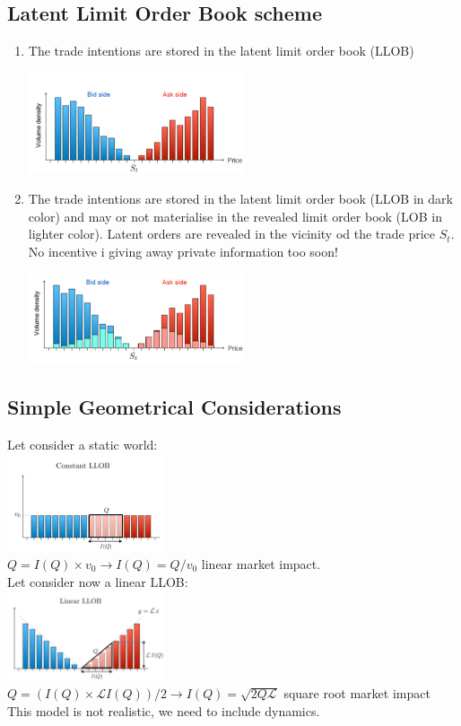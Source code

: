 \subsection{Latent Limit Order Book scheme}
\begin{enumerate}
	\item The trade intentions are stored in the latent limit order book (LLOB)
\begin{center}
	\includegraphics[width=0.5\textwidth]{picture/(26)lob_1.png}
\end{center}
\item The trade intentions are stored in the latent limit order book (LLOB in dark color) and may or not materialise in the revealed limit order book (LOB in lighter color). Latent orders are revealed in the vicinity od the trade price $S_t$. No incentive i giving away private information too soon!
\begin{center}
	\includegraphics[width=0.5\textwidth]{picture/(27)lob_2.png}
\end{center}
\end{enumerate}
\subsection{Simple Geometrical Considerations}
Let consider a static world:\\
\includegraphics[width=0.35\textwidth]{picture/(28)costant_llob.png}\\
$Q = I(Q) \times v_0 \rightarrow I(Q) =Q/v_0$ linear market impact.\\
Let consider now a linear LLOB:\\
\includegraphics[width=0.35\textwidth]{picture/(29)linear_llob.png}\\
$ Q = (I(Q) \times \mathcal{L} I(Q))/2 \rightarrow I(Q) = \sqrt{2Q\mathcal{L}}$ square root market impact\\
This model is not realistic, we need to include dynamics.
